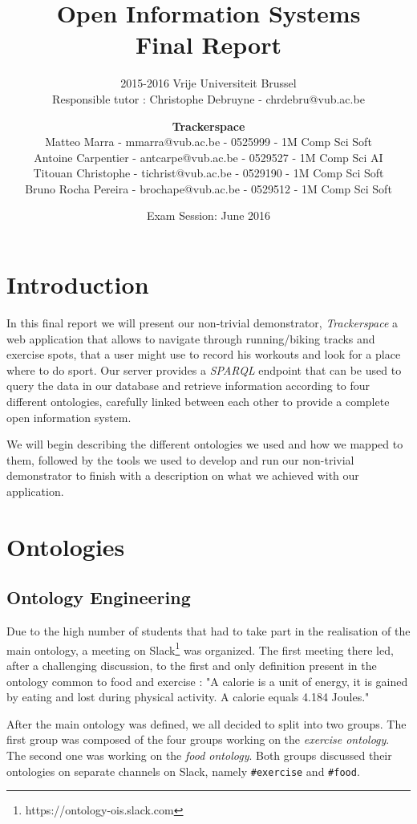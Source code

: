 \documentclass[11pt,a4paper]{scrreprt}
\title{\textbf{Open Information Systems\\Final Report}}
\subtitle{2015-2016 Vrije Universiteit Brussel\\Responsible tutor : Christophe Debruyne - chrdebru@vub.ac.be}
\author{\textbf{Trackerspace}\\Matteo Marra - mmarra@vub.ac.be - 0525999 - 1M Comp Sci Soft\\Antoine Carpentier - antcarpe@vub.ac.be - 0529527 - 1M Comp Sci AI\\Titouan Christophe - tichrist@vub.ac.be - 0529190 - 1M Comp Sci Soft\\Bruno Rocha Pereira - brochape@vub.ac.be - 0529512 - 1M Comp Sci Soft}
\date{Exam Session: June 2016}
\begin{document}
\maketitle
\chapter{Introduction}
In this final report we will present our non-trivial demonstrator, \textit{Trackerspace} a web application that allows to navigate through running/biking tracks and exercise spots, that a user might use to record his workouts and look for a place where to do sport.
Our server provides a \textit{SPARQL} endpoint that can be used to query the data in our database and retrieve information according to four different ontologies, carefully linked between each other to provide a complete open information system.

We will begin describing the different ontologies we used and how we mapped to them, followed by the tools we used to develop and run our non-trivial demonstrator to finish with a description on what we achieved with our application.
\chapter{Ontologies}
\section{Ontology Engineering}
Due to the high number of students that had to take part in the realisation of the main ontology, a meeting on Slack\footnote{https://ontology-ois.slack.com} was organized. The first meeting there led, after a challenging discussion, to the first and only definition present in the ontology common to food and exercise : "A calorie is a unit of energy, it is gained by eating and lost during physical activity. A calorie equals 4.184 Joules." 

After the main ontology was defined, we all decided to split into two groups. The first group was composed of the four groups working on the \textit{exercise ontology}. The second one was working on the \textit{food ontology}. Both groups discussed their ontologies on separate channels on Slack, namely \texttt{\#exercise} and \texttt{\#food}.
\end{document}
